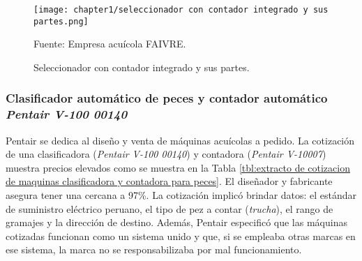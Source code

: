 \begin{figure}[H]
	\centering
	\texttt{[image: chapter1/seleccionador con contador integrado y sus partes.png]}
	\caption{Seleccionador con contador integrado y sus partes.}
	\begin{myflushleftportland}		
		Fuente: Empresa acuícola FAIVRE.
	\end{myflushleftportland}
	\label{fig:seleccionador con contador integrado y sus partes}
\end{figure}

\subsubsection{Clasificador automático de peces y contador automático \textit{Pentair V-100 00140}}

Pentair se dedica al diseño y venta de máquinas acuícolas a pedido. La cotización de una clasificadora (\textit{Pentair V-100 00140}) y contadora (\textit{Pentair V-10007}) muestra precios elevados como se muestra en la Tabla \ref{tbl:extracto de cotizacion de maquinas clasificadora y contadora para peces}. El diseñador y fabricante asegura tener una cercana a 97\%. La cotización implicó brindar datos: el estándar de suministro eléctrico peruano, el tipo de pez a contar (\textit{trucha}), el rango de gramajes y la dirección de destino. Además, Pentair especificó que las máquinas cotizadas funcionan como un sistema unido y que, si se empleaba otras marcas en ese sistema, la marca no se responsabilizaba por mal funcionamiento.


